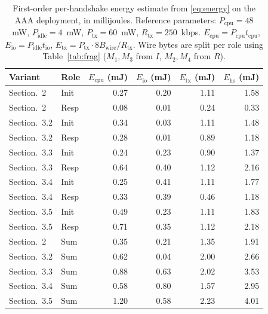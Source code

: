\documentclass{easychair}
\newcommand{\VarSecShort}[1]{Section.~#1}
\begin{document}
\begin{table}[H]
\centering
\footnotesize
\caption{First-order per-handshake energy estimate from
\eqref{eq:energy} on the AAA deployment, in millijoules. Reference
parameters: $P_{\mathrm{cpu}}\!=\!48$~mW, $P_{\mathrm{idle}}\!=\!4$~mW,
$P_{\mathrm{tx}}\!=\!60$~mW, $R_{\mathrm{tx}}\!=\!250$~kbps.
$E_{\mathrm{cpu}}\!=\!P_{\mathrm{cpu}} t_{\mathrm{cpu}}$,
$E_{\mathrm{io}}\!=\!P_{\mathrm{idle}} t_{\mathrm{io}}$,
$E_{\mathrm{tx}}\!=\!P_{\mathrm{tx}}\!\cdot\!8B_{\mathrm{wire}}/R_{\mathrm{tx}}$.
Wire bytes are split per role using Table~\ref{tab:frag} ($M_1,M_3$
from $I$, $M_2,M_4$ from $R$).}
\label{tab:energy}
\begin{tabular}{llrrrr}
\toprule
\textbf{Variant} & \textbf{Role} & $E_{\mathrm{cpu}}$ (mJ) & $E_{\mathrm{io}}$ (mJ) & $E_{\mathrm{tx}}$ (mJ) & $E_{\mathrm{hs}}$ (mJ) \\
\midrule
\VarSecShort{2}   & Init & 0.27 & 0.20 & 1.11 &  1.58 \\
\VarSecShort{2}   & Resp & 0.08 & 0.01 & 0.24 &  0.33 \\
\VarSecShort{3.2} & Init & 0.34 & 0.03 & 1.11 &  1.48 \\
\VarSecShort{3.2} & Resp & 0.28 & 0.01 & 0.89 &  1.18 \\
\VarSecShort{3.3} & Init & 0.24 & 0.23 & 0.90 &  1.37 \\
\VarSecShort{3.3} & Resp & 0.64 & 0.40 & 1.12 &  2.16 \\
\VarSecShort{3.4} & Init & 0.25 & 0.41 & 1.11 &  1.77 \\
\VarSecShort{3.4} & Resp & 0.33 & 0.39 & 0.46 &  1.18 \\
\VarSecShort{3.5} & Init & 0.49 & 0.23 & 1.11 &  1.83 \\
\VarSecShort{3.5} & Resp & 0.71 & 0.35 & 1.12 &  2.18 \\
\midrule
\VarSecShort{2}   & Sum  & 0.35 & 0.21 & 1.35 &  1.91 \\
\VarSecShort{3.2} & Sum  & 0.62 & 0.04 & 2.00 &  2.66 \\
\VarSecShort{3.3} & Sum  & 0.88 & 0.63 & 2.02 &  3.53 \\
\VarSecShort{3.4} & Sum  & 0.58 & 0.80 & 1.57 &  2.95 \\
\VarSecShort{3.5} & Sum  & 1.20 & 0.58 & 2.23 &  4.01 \\
\bottomrule
\end{tabular}
\end{table}
\end{document}
